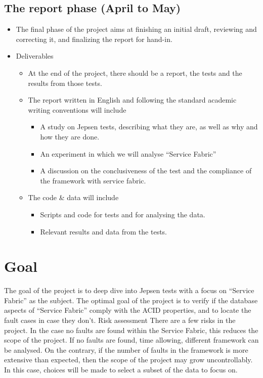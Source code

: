 \documentclass[a4paper,10pt,titlepage]{report}
\begin{document}
\subsection{The report phase (April to May)}
\begin{itemize}
\item The final phase of the project aims at finishing an initial draft, reviewing and correcting it, and finalizing the report for hand-in.
\item	Deliverables 
\begin{itemize}
\item	At the end of the project, there should be a report, the tests and the results from those tests. 
\item	The report written in English and following the standard academic writing conventions will include 
\begin{itemize}
\item	A study on Jepsen tests, describing what they are, as well as why and how they are done.
\item	An experiment in which we will analyse “Service Fabric”	
\item	A discussion on the conclusiveness of the test and the compliance of the framework with service fabric.
\end{itemize}
\item	The code \& data will include
\begin{itemize}
\item	Scripts and code for tests and for analysing the data.
\item	Relevant results and data from the tests. 
\end{itemize}
\end{itemize}
\end{itemize}

\section{Goal    }  
The goal of the project is to deep dive into Jepsen tests with a focus on “Service Fabric” as the subject. The optimal goal of the project is to verify if the database aspects of “Service Fabric” comply with the ACID properties, and to locate the fault cases in case they don’t.    
Risk assessment 
There are a few risks in the project. In the case no faults are found within the Service Fabric, this reduces the scope of the project. If no faults are found, time allowing, different framework can be analysed. On the contrary, if the number of faults in the framework is more extensive than expected, then the scope of the project may grow uncontrollably. In this case, choices will be made to select a subset of the data to focus on.
 
\end{document}
